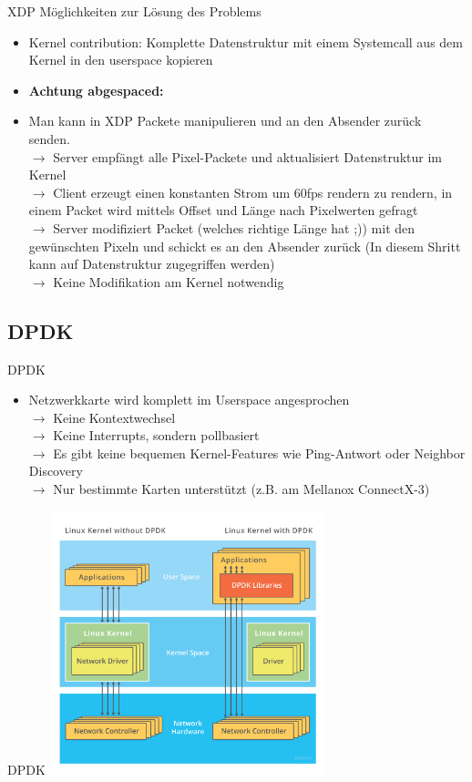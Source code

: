 \documentclass[12pt,donthandout,notes=dontshow,xcolor=table]{beamer}
\begin{document}
\begin{frame}{XDP}
	Möglichkeiten zur Lösung des Problems
	\begin{itemize}
		\item Kernel contribution: Komplette Datenstruktur mit einem Systemcall aus dem Kernel in den userspace kopieren
		\pause
		\item \textbf{Achtung abgespaced:}
		\pause
		\item Man kann in XDP Packete manipulieren und an den Absender zurück senden.\\
		$\rightarrow$ Server empfängt alle Pixel-Packete und aktualisiert Datenstruktur im Kernel\\
		$\rightarrow$ Client erzeugt einen konstanten Strom um 60fps rendern zu rendern, in einem Packet wird mittels Offset und Länge nach Pixelwerten gefragt\\
		$\rightarrow$ Server modifiziert Packet (welches richtige Länge hat ;)) mit den gewünschten Pixeln und schickt es an den Absender zurück (In diesem Shritt kann auf Datenstruktur zugegriffen werden)\\
		$\rightarrow$ Keine Modifikation am Kernel notwendig
	\end{itemize}
\end{frame}

\subsection{DPDK}
\begin{frame}{DPDK}
	\begin{itemize}
		\item Netzwerkkarte wird komplett im Userspace angesprochen\\
		$\rightarrow$ Keine Kontextwechsel\\
		$\rightarrow$ Keine Interrupts, sondern pollbasiert\\
		$\rightarrow$ Es gibt keine bequemen Kernel-Features wie Ping-Antwort oder Neighbor Discovery\\
		$\rightarrow$ Nur bestimmte Karten unterstützt (z.B. am Mellanox ConnectX-3)
	\end{itemize}
\end{frame}

\begin{frame}{DPDK}
	\hspace{2cm}
	\includegraphics[width=8cm]{figures/dpdk}
\end{frame}
\end{document}
